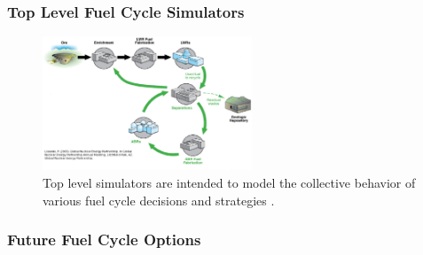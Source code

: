 \begin{frame}[ctb!]
  \frametitle{Top Level Fuel Cycle Simulators}
  \begin{figure}[htbp!]
    \begin{center}
      \includegraphics[height=4cm]{./images/simulations.eps}
    \end{center}
    \caption{Top level simulators are intended to model the collective 
    behavior of various fuel cycle decisions and 
    strategies \cite{lisowski_global_2007}.}
    \label{fig:simulation}
  \end{figure}
\end{frame}

\begin{frame}[ctb!]
  \frametitle{Future Fuel Cycle Options}
    
\end{frame}
